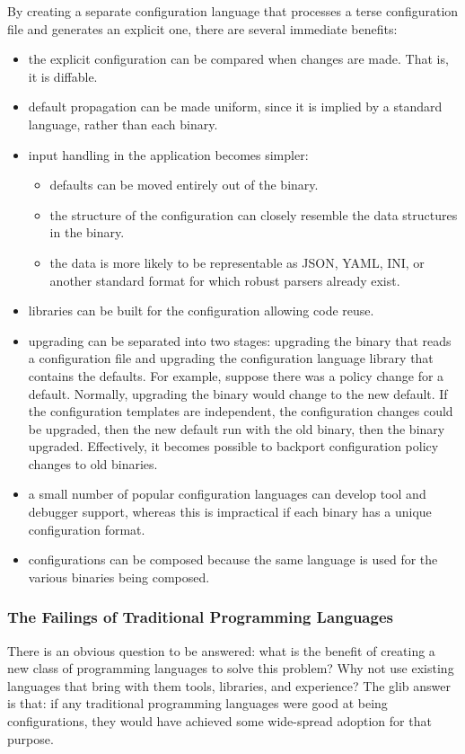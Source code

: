 \documentclass[letterpaper,twocolumn,10pt]{article}
\begin{document}
By creating a separate configuration language that processes a terse configuration file and generates an explicit one, there are several immediate benefits:

\begin{itemize}
\item the explicit configuration can be compared when changes are made. That is, it is diffable.
\item default propagation can be made uniform, since it is implied by a standard language, rather than each binary.
\item input handling in the application becomes simpler:
	\begin{itemize}
	\item defaults can be moved entirely out of the binary.
	\item the structure of the configuration can closely resemble the data structures in the binary.
	\item the data is more likely to be representable as JSON, YAML, INI, or another standard format for which robust parsers already exist.
  \end{itemize}
\item libraries can be built for the configuration allowing code reuse.
\item upgrading can be separated into two stages: upgrading the binary that reads a configuration file and upgrading the configuration language library that contains the defaults. For example, suppose there was a policy change for a default. Normally, upgrading the binary would change to the new default. If the configuration templates are independent, the configuration changes could be upgraded, then the new default run with the old binary, then the binary upgraded. Effectively, it becomes possible to backport configuration policy changes to old binaries.
\item a small number of popular configuration languages can develop tool and debugger support, whereas this is impractical if each binary has a unique configuration format.
\item configurations can be composed because the same language is used for the various binaries being composed.
\end{itemize}

\subsubsection{The Failings of Traditional Programming Languages}
There is an obvious question to be answered: what is the benefit of creating a new class of programming languages to solve this problem? Why not use existing languages that bring with them tools, libraries, and experience? The glib answer is that: if any traditional programming languages were good at being configurations, they would have achieved some wide-spread adoption for that purpose.
\end{document}
